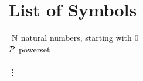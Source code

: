 
\clearpage

\section*{List of Symbols}

\vspace{1em}

\begin{tabbing}
\hspace*{3cm}    \= \kill
$\mathbb{N}$           \> natural numbers, starting with $0$ \\
$\mathcal{P}$           \> powerset \\
\\
\vdots \\
\end{tabbing}
